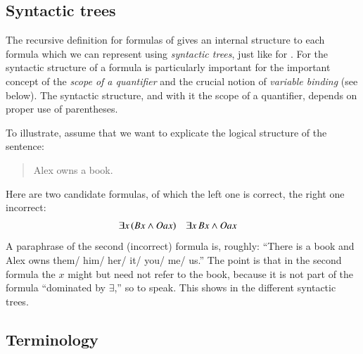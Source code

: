 \documentclass[nobib,nofonts]{tufte-handout}
\newcommand{\proplog}{\acro{PropLog}}
\newcommand{\predlog}{\acro{PredLog}}
\begin{document}
\subsection{Syntactic trees}

The recursive definition for formulas of \predlog gives an internal structure to each formula which we can represent using \emph{syntactic trees}, just like for \proplog.
For \predlog the syntactic structure of a formula is particularly important for the important concept of the \emph{scope of a quantifier} and the crucial notion of \emph{variable binding} (see below).
The syntactic structure, and with it the scope of a quantifier, depends on proper use of parentheses.

To illustrate, assume that we want to explicate the logical structure of the sentence:
\begin{quote}
  Alex owns a book.
\end{quote}
Here are two candidate formulas, of which the left one is correct, the right one incorrect:
\begin{align*}
 & \exists x \thinspace (Bx \wedge Oax) && \exists x \thinspace Bx \wedge Oax
\end{align*}
A paraphrase of the second (incorrect) formula is, roughly: ``There is a book and Alex owns them/ him/ her/ it/ you/ me/ us.''
The point is that in the second formula the $x$ might but need not refer to the book, because it is not part of the formula ``dominated by \(\exists\),'' so to speak.
This shows in the different syntactic trees.

\begin{center}
  \hfill
\end{center}

\subsection{Terminology}
\end{document}
